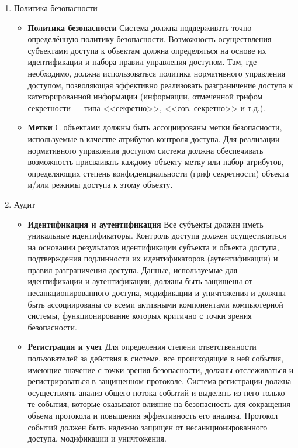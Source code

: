 \begin{enumerate}
	\item Политика безопасности
	\begin{itemize}
		\item \textbf{Политика безопасности}
		Система должна поддерживать точно определённую политику безопасности. Возможность осуществления субъектами доступа к объектам должна определяться на основе их идентификации и набора правил управления доступом. Там, где необходимо, должна использоваться политика нормативного управления доступом, позволяющая эффективно реализовать разграничение доступа к категорированной информации (информации, отмеченной грифом секретности — типа <<секретно>>, <<сов. секретно>> и т.д.).
		\item \textbf{Метки} С объектами должны быть ассоциированы метки безопасности, используемые в качестве атрибутов контроля доступа. Для реализации нормативного управления доступом система должна обеспечивать возможность присваивать каждому объекту метку или набор атрибутов, определяющих  степень конфиденциальности (гриф секретности) объекта и/или режимы доступа к этому объекту.
	\end{itemize}
	\item Аудит
	\begin{itemize}
		\item \textbf{Идентификация и аутентификация} Все субъекты должен иметь уникальные идентификаторы. Контроль доступа должен осуществляться на основании результатов идентификации субъекта и объекта доступа, подтверждения подлинности их идентификаторов (аутентификации) и правил разграничения доступа. Данные, используемые для идентификации и аутентификации, должны быть защищены от несанкционированного доступа, модификации и уничтожения и должны быть ассоциированы со всеми активными компонентами компьютерной системы, функционирование которых критично с точки зрения безопасности.
		\item \textbf{Регистрация и учет} Для определения степени ответственности пользователей за действия в системе, все происходящие в ней события, имеющие значение с точки зрения безопасности, должны отслеживаться и регистрироваться в защищенном протоколе. Система регистрации должна осуществлять анализ общего потока событий и выделять из него только те события, которые оказывают влияние на безопасность для сокращения объема протокола и повышения эффективность его анализа. Протокол событий должен быть надежно защищен от несанкционированного доступа, модификации и уничтожения.
	\end{itemize}

\end{enumerate}
